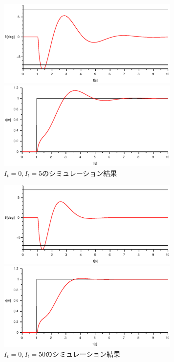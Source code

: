 \documentclass[titlepage]{jsarticle}
\begin{document}
            \begin{figure}[h]
                \begin{minipage}{0.5\hsize}
                    \centering
                    \includegraphics[width=9cm]{img/I0-5t.eps}
                \end{minipage}
                \begin{minipage}{0.5\hsize}
                    \centering
                    \includegraphics[width=9cm]{img/I0-5x.eps}
                \end{minipage}
                \caption{$I_t = 0, I_l = 5$のシミュレーション結果}
                \label{fig:i0-5}
            \end{figure}
            \begin{figure}[h]
                \begin{minipage}{0.5\hsize}
                    \centering
                    \includegraphics[width=9cm]{img/I0-50t.eps}
                \end{minipage}
                \begin{minipage}{0.5\hsize}
                    \centering
                    \includegraphics[width=9cm]{img/I0-50x.eps}
                \end{minipage}
                \caption{$I_t = 0, I_l = 50$のシミュレーション結果}
                \label{fig:i0-50}
            \end{figure}
\end{document}
